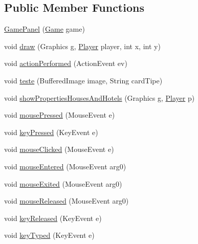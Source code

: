 \subsection*{Public Member Functions}
\begin{DoxyCompactItemize}
\item 
\hyperlink{class_monopoly_1_1_gui_1_1_game_panel_a5d29924ab30b719b403453d61d5591b6}{Game\+Panel} (\hyperlink{class_monopoly_1_1_logic_1_1_game}{Game} game)
\item 
void \hyperlink{class_monopoly_1_1_gui_1_1_game_panel_aa8b1c7dfb466fd5a282b259a8dc915bc}{draw} (Graphics g, \hyperlink{class_monopoly_1_1_logic_1_1_player}{Player} player, int x, int y)
\item 
void \hyperlink{class_monopoly_1_1_gui_1_1_game_panel_a8f402ea9ba3f0a8aff2b5d313d223e7f}{action\+Performed} (Action\+Event ev)
\item 
void \hyperlink{class_monopoly_1_1_gui_1_1_game_panel_ae13e10a310bc5804f3142bffc612aa92}{teste} (Buffered\+Image image, String card\+Tipe)
\item 
void \hyperlink{class_monopoly_1_1_gui_1_1_game_panel_ab541c5881bf46e62861710187cdd6440}{show\+Properties\+Houses\+And\+Hotels} (Graphics g, \hyperlink{class_monopoly_1_1_logic_1_1_player}{Player} p)
\item 
void \hyperlink{class_monopoly_1_1_gui_1_1_game_panel_a725c88577f2d6f858de5f6b4ce1de3a8}{mouse\+Pressed} (Mouse\+Event e)
\item 
void \hyperlink{class_monopoly_1_1_gui_1_1_game_panel_a594fbb33342987bf2ed846f9b7735375}{key\+Pressed} (Key\+Event e)
\item 
void \hyperlink{class_monopoly_1_1_gui_1_1_game_panel_a35830c40d200c3575d6cf01babb1f0c3}{mouse\+Clicked} (Mouse\+Event e)
\item 
void \hyperlink{class_monopoly_1_1_gui_1_1_game_panel_a261ce732f985af869b0689bcc4dade56}{mouse\+Entered} (Mouse\+Event arg0)
\item 
void \hyperlink{class_monopoly_1_1_gui_1_1_game_panel_a36af0f86a579f70d178115274046886f}{mouse\+Exited} (Mouse\+Event arg0)
\item 
void \hyperlink{class_monopoly_1_1_gui_1_1_game_panel_a99614367954cec11893f545f6a85eb16}{mouse\+Released} (Mouse\+Event arg0)
\item 
void \hyperlink{class_monopoly_1_1_gui_1_1_game_panel_a46f4aef079bf0f0d0b4f7618733ad129}{key\+Released} (Key\+Event e)
\item 
void \hyperlink{class_monopoly_1_1_gui_1_1_game_panel_af029eb183ea23ea04c88a1b6881abc20}{key\+Typed} (Key\+Event e)
\end{DoxyCompactItemize}
